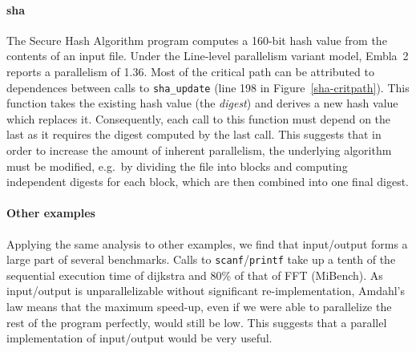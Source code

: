 \paragraph{\textsf{sha}}

The Secure Hash Algorithm program computes a 160-bit hash value from the contents of an input file.
Under the \textsf{Line-level parallelism} variant model, Embla~2 reports a parallelism of 1.36.
Most of the critical path can be attributed to dependences between calls to
\texttt{sha\_update} (line 198 in Figure~\ref{sha-critpath}).
This function takes the existing hash value (the \emph{digest}) and derives a new hash value which replaces it.
Consequently, each call to this function must depend on the last as it requires the digest computed by the last call.
This suggests that in order to increase the amount of inherent parallelism, the underlying algorithm must be modified, e.g.\ by dividing the file into blocks and computing independent digests for each block, which are then combined into one final digest.

\paragraph{Other examples}

Applying the same analysis to other examples, we find that input/output forms a large part of several benchmarks.
Calls to \texttt{scanf}/\texttt{printf} take up a tenth of the sequential
execution time of \textsf{dijkstra} and 80\% of that of \textsf{FFT} (MiBench).
As input/output is unparallelizable without significant re-implementation, Amdahl's law means that the maximum speed-up, even if we were able to parallelize the rest of the program perfectly, would still be low.
This suggests that a parallel implementation of input/output would be very useful.










































